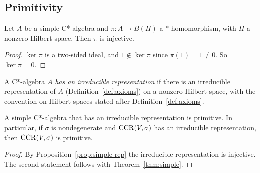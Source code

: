 \begin{remark}\label{rem:not-regular}
\end{remark}

\subsection{Primitivity}\label{ssec:primitive}

\begin{proposition}\label{prop:simple-rep}
Let $A$ be a simple C*-algebra and $\pi:A\to B(H)$ a $*$-homomorphism, with $H$ a nonzero Hilbert
space. Then $\pi$ is injective.
\end{proposition}
\begin{proof}
$\ker\pi$ is a two-sided ideal, and $1\notin\ker\pi$ since $\pi(1)=1\neq0$. So $\ker\pi=0$.
\end{proof}

\begin{definition}\label{def:has-irrep}
A C*-algebra $A$ \emph{has an irreducible representation} if there is an irreducible
representation of $A$ (Definition~\ref{def:axioms}) on a nonzero Hilbert space, with the
convention on Hilbert spaces stated after Definition~\ref{def:axioms}.
\end{definition}

\begin{theorem}[Primitivity]\label{thm:primitive}
A simple C*-algebra that has an irreducible representation is primitive. In particular, if
$\sigma$ is nondegenerate and $\operatorname{CCR}(V,\sigma)$ has an irreducible representation, then
$\operatorname{CCR}(V,\sigma)$ is primitive.
\end{theorem}
\begin{proof}
By Proposition~\ref{prop:simple-rep} the irreducible representation is injective. The second
statement follows with Theorem~\ref{thm:simple}.
\end{proof}

